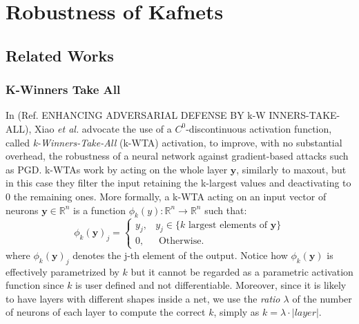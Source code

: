 \documentclass[LaM,binding=0.6cm]{./packages/sapthesis/sapthesis}
\begin{document}
    
\part{Robustness of Kafnets}

    \chapter{Related Works}
    \label{chap:5}
       
    \section{K-Winners Take All}
    In (Ref. ENHANCING ADVERSARIAL DEFENSE BY k-W INNERS-TAKE-ALL), Xiao \textit{et al.} advocate the use of a $C^0$-discontinuous activation function, called
    \textit{k-Winners-Take-All} (k-WTA) activation, to improve, with no substantial overhead, the robustness of a neural network against gradient-based attacks such as PGD.
    k-WTAs work by acting on the whole layer $\mathbf{y}$, similarly to maxout, but in this case they filter the input retaining the k-largest values and deactivating to 0 the remaining ones.
    More formally, a k-WTA acting on an input vector of neurons $\mathbf{y} \in \mathbb{R}^{n}$ is a function $\phi_k(y) : \mathbb{R}^n \to \mathbb{R}^n$ such that:
    \begin{equation}
        \phi_k(\mathbf{y})_j = \left\{\begin{array}{ll}
            y_{j}, & y_{j} \in\{k \text { largest elements of } \boldsymbol{y}\} \\
            0, & \text { Otherwise. }
            \end{array}\right. 
    \end{equation}
    where $\phi_k(\mathbf{y})_j$ denotes the j-th element of the output. Notice how $\phi_k(\mathbf{y})$ is effectively 
    parametrized by $k$ but it cannot be regarded as a parametric activation function since $k$ is user defined and not
    differentiable. Moreover, since it is likely to have layers with different shapes inside a net, we use the \textit{ratio $\lambda$}
    of the number of neurons of each layer to compute the correct $k$, simply as $k = \lambda \cdot |layer|$.
\end{document}
